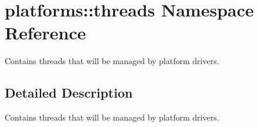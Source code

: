 \hypertarget{namespaceplatforms_1_1threads}{}\section{platforms\+:\+:threads Namespace Reference}
\label{namespaceplatforms_1_1threads}


Contains threads that will be managed by platform drivers.  




\subsection{Detailed Description}
Contains threads that will be managed by platform drivers. 